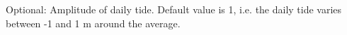 Optional\+: Amplitude of daily tide. Default value is 1, i.\+e. the daily tide varies between -\/1 and 1 m around the average. 